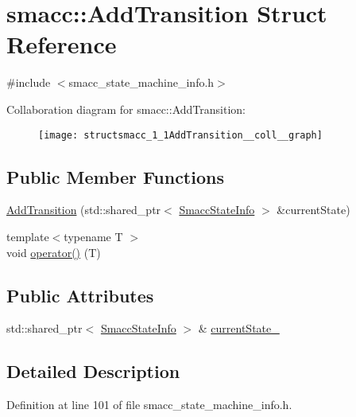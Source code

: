 \hypertarget{structsmacc_1_1AddTransition}{}\section{smacc\+:\+:Add\+Transition Struct Reference}
\label{structsmacc_1_1AddTransition}


{\ttfamily \#include $<$smacc\+\_\+state\+\_\+machine\+\_\+info.\+h$>$}



Collaboration diagram for smacc\+:\+:Add\+Transition\+:
\nopagebreak
\begin{figure}[H]
\begin{center}
\leavevmode
\texttt{[image: structsmacc\_1\_1AddTransition\_\_coll\_\_graph]}
\end{center}
\end{figure}
\subsection*{Public Member Functions}
\begin{DoxyCompactItemize}
\item 
\hyperlink{structsmacc_1_1AddTransition_aaca309ef77d327ac3ac9c45af7d9b902}{Add\+Transition} (std\+::shared\+\_\+ptr$<$ \hyperlink{classsmacc_1_1SmaccStateInfo}{Smacc\+State\+Info} $>$ \&current\+State)
\item 
{\footnotesize template$<$typename T $>$ }\\void \hyperlink{structsmacc_1_1AddTransition_a4d4ece2e48045d830fc924b094522d36}{operator()} (T)
\end{DoxyCompactItemize}
\subsection*{Public Attributes}
\begin{DoxyCompactItemize}
\item 
std\+::shared\+\_\+ptr$<$ \hyperlink{classsmacc_1_1SmaccStateInfo}{Smacc\+State\+Info} $>$ \& \hyperlink{structsmacc_1_1AddTransition_a0fd1d2d424ac74b700a46f8409fc8353}{current\+State\+\_\+}
\end{DoxyCompactItemize}


\subsection{Detailed Description}


Definition at line 101 of file smacc\+\_\+state\+\_\+machine\+\_\+info.\+h.



